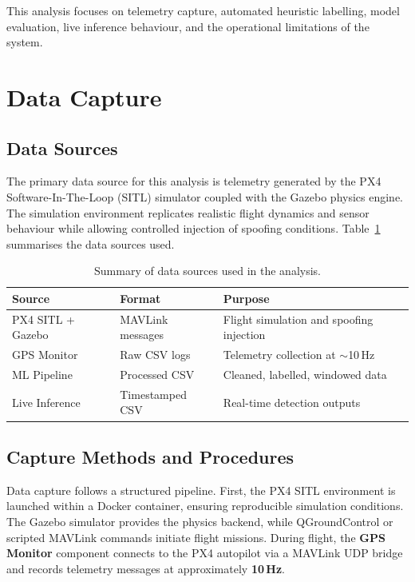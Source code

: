\documentclass[11pt,a4paper]{article}
\begin{document}
This analysis focuses on telemetry capture, automated heuristic labelling, model evaluation, live inference behaviour, and the operational limitations of the system.

\section{Data Capture}

\subsection{Data Sources}

The primary data source for this analysis is telemetry generated by the PX4 Software-In-The-Loop (SITL) simulator coupled with the Gazebo physics engine. The simulation environment replicates realistic flight dynamics and sensor behaviour while allowing controlled injection of spoofing conditions. Table~\ref{tab:data_sources} summarises the data sources used.

\begin{table}[H]
\centering
\caption{Summary of data sources used in the analysis.}
\label{tab:data_sources}
\begin{tabular}{@{}lll@{}}
\toprule
\textbf{Source} & \textbf{Format} & \textbf{Purpose} \\
\midrule
PX4 SITL + Gazebo & MAVLink messages & Flight simulation and spoofing injection \\
GPS Monitor & Raw CSV logs & Telemetry collection at $\sim$10\,Hz \\
ML Pipeline & Processed CSV & Cleaned, labelled, windowed data \\
Live Inference & Timestamped CSV & Real-time detection outputs \\
\bottomrule
\end{tabular}
\end{table}

\subsection{Capture Methods and Procedures}

Data capture follows a structured pipeline. First, the PX4 SITL environment is launched within a Docker container, ensuring reproducible simulation conditions. The Gazebo simulator provides the physics backend, while QGroundControl or scripted MAVLink commands initiate flight missions. During flight, the \textbf{GPS Monitor} component connects to the PX4 autopilot via a MAVLink UDP bridge and records telemetry messages at approximately \textbf{10\,Hz}.
\end{document}
